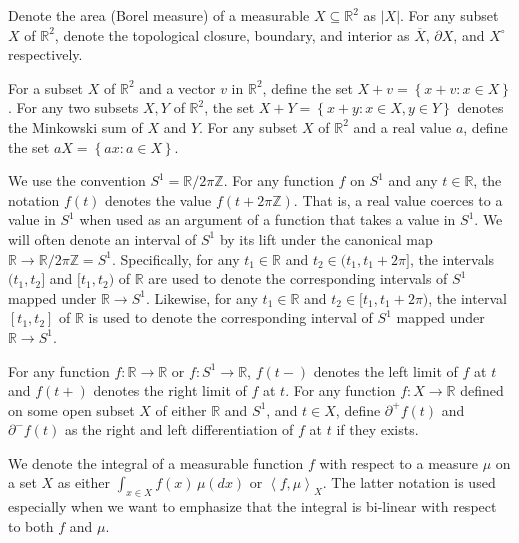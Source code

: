 Denote the area (Borel measure) of a measurable \(X \subseteq \mathbb{R}^2\) as \(|X|\). For any subset \(X\) of \(\mathbb{R}^2\), denote the topological closure, boundary, and interior as \(\overline{X}\), \(\partial X\), and \(X^\circ\) respectively.

For a subset \(X\) of \(\mathbb{R}^2\) and a vector \(v\) in \(\mathbb{R}^2\), define the set \(X + v = \left\{ x + v : x \in X \right\}\). For any two subsets \(X, Y\) of \(\mathbb{R}^2\), the set \(X + Y = \left\{ x + y : x \in X, y \in Y \right\}\) denotes the Minkowski sum of \(X\) and \(Y\). For any subset \(X\) of \(\mathbb{R}^2\) and a real value \(a\), define the set \(aX = \left\{ ax : a \in X \right\}\).

We use the convention \(S^1 = \mathbb{R} / 2 \pi \mathbb{Z}\). For any function \(f\) on \(S^1\) and any \(t \in \mathbb{R}\), the notation \(f(t)\) denotes the value \(f(t + 2 \pi \mathbb{Z})\). That is, a real value coerces to a value in \(S^1\) when used as an argument of a function that takes a value in \(S^1\). We will often denote an interval of \(S^1\) by its lift under the canonical map \(\mathbb{R} \to \mathbb{R} / 2 \pi \mathbb{Z} = S^1\). Specifically, for any \(t_1 \in \mathbb{R}\) and \(t_2 \in (t_1, t_1 + 2\pi]\), the intervals \((t_1, t_2]\) and \([t_1, t_2)\) of \(\mathbb{R}\) are used to denote the corresponding intervals of \(S^1\) mapped under \(\mathbb{R} \to S^1\). Likewise, for any \(t_1 \in \mathbb{R}\) and \(t_2 \in [t_1, t_1 + 2\pi)\), the interval \([t_1, t_2]\) of \(\mathbb{R}\) is used to denote the corresponding interval of \(S^1\) mapped under \(\mathbb{R} \to S^1\).

For any function \(f : \mathbb{R} \to \mathbb{R}\) or \(f : S^1 \to \mathbb{R}\), \(f(t-)\) denotes the left limit of \(f\) at \(t\) and \(f(t+)\) denotes the right limit of \(f\) at \(t\). For any function \(f : X \to \mathbb{R}\) defined on some open subset \(X\) of either \(\mathbb{R}\) and \(S^1\), and \(t \in X\), define \(\partial^+f(t)\) and \(\partial^-f(t)\) as the right and left differentiation of \(f\) at \(t\) if they exists.

We denote the integral of a measurable function \(f\) with respect to a measure \(\mu\) on a set \(X\) as either \(\int_{x \in X} f(x) \, \mu(dx)\) or \(\left< f, \mu \right>_X\). The latter notation is used especially when we want to emphasize that the integral is bi-linear with respect to both \(f\) and \(\mu\).